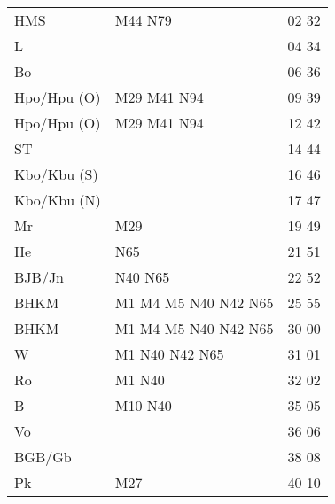 \begin{tabular}{!{\color{schiefergrau}\vrule width 3pt}*{3}{l!{\color{schiefergrau}\vrule width 3pt}}}
\hline
{}
 \\
\hline
HMS          & \mbus{} M44 \nbus{} N79                                    & 02 32 \\
L            &                                                            & 04 34 \\
Bo           &                                                            & 06 36 \\
Hpo/Hpu (O)  & \nusieben{} \mbus{} M29 M41 \nbus{} N94                    & 09 39 \\
\hline
Hpo/Hpu (O)  & \nusieben{} \mbus{} M29 M41 \nbus{} N94                    & 12 42 \\
ST           &                                                            & 14 44 \\
Kbo/Kbu (S)  & \nueins{}                                                  & 16 46 \\
Kbo/Kbu (N)  & \nueins{}                                                  & 17 47 \\
Mr           & \mbus{} M29                                                & 19 49 \\
He           & \nbus{} N65                                                & 21 51 \\
BJB/Jn       & \nbus{} N40 N65                                            & 22 52 \\
BHKM         & \nuzwei{} \nufuenf{} \mtram{} M1 M4 M5 \nbus{} N40 N42 N65 & 25 55 \\
\hline
BHKM         & \nuzwei{} \nufuenf{} \mtram{} M1 M4 M5 \nbus{} N40 N42 N65 & 30 00 \\
W            & \nuzwei{} \nufuenf{} \mtram{} M1 \nbus{} N40 N42 N65       & 31 01 \\
Ro           & \mtram{} M1 \nbus{} N40                                    & 32 02 \\
B            & \mtram{} M10 \nbus{} N40                                   & 35 05 \\
Vo           &                                                            & 36 06 \\
BGB/Gb       &                                                            & 38 08 \\
Pk           & \mbus{} M27                                                & 40 10 \\

\end{tabular}
